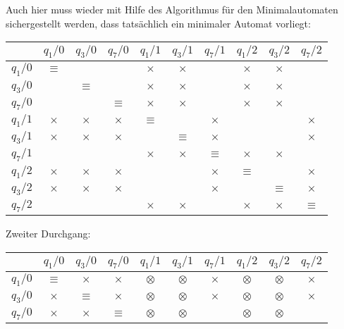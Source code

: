 \begin{loesung}
\begin{teilaufgaben}
Auch hier muss wieder mit Hilfe des Algorithmus für den Minimalautomaten
sichergestellt werden, dass tatsächlich ein minimaler Automat vorliegt:
\begin{center}
\begin{tabular}{|c|ccccccccc|}
\hline
         &$q_1/0$  &$q_3/0$  &$q_7/0$  &$q_1/1$  &$q_3/1$  &$q_7/1$  &$q_1/2$  &$q_3/2$  &$q_7/2$  \\
\hline
$q_1/0$  &$\equiv$ &$       $&$       $&$\times $&$\times $&$       $&$\times $&$\times $&$       $\\
$q_3/0$  &$       $&$\equiv$ &$       $&$\times $&$\times $&$       $&$\times $&$\times $&$       $\\
$q_7/0$  &$       $&$       $&$\equiv$ &$\times $&$\times $&$       $&$\times $&$\times $&$       $\\
$q_1/1$  &$\times $&$\times $&$\times $&$\equiv$ &$       $&$\times $&$       $&$       $&$\times $\\
$q_3/1$  &$\times $&$\times $&$\times $&$       $&$\equiv$ &$\times $&$       $&$       $&$\times $\\
$q_7/1$  &$       $&$       $&$       $&$\times $&$\times $&$\equiv$ &$\times $&$\times $&$       $\\
$q_1/2$  &$\times $&$\times $&$\times $&$       $&$       $&$\times $&$\equiv$ &$       $&$\times $\\
$q_3/2$  &$\times $&$\times $&$\times $&$       $&$       $&$\times $&$       $&$\equiv$ &$\times $\\
$q_7/2$  &$       $&$       $&$       $&$\times $&$\times $&$       $&$\times $&$\times $&$\equiv$ \\
\hline
\end{tabular}
\end{center}
Zweiter Durchgang:
\begin{center}
\begin{tabular}{|c|ccccccccc|}
\hline
         &$q_1/0$  &$q_3/0$  &$q_7/0$  &$q_1/1$  &$q_3/1$  &$q_7/1$  &$q_1/2$  &$q_3/2$  &$q_7/2$  \\
\hline
$q_1/0$  &$\equiv$ &$\times $&$\times $&$\otimes$&$\otimes$&$\times $&$\otimes$&$\otimes$&$\times $\\
$q_3/0$  &$\times $&$\equiv$ &$\times $&$\otimes$&$\otimes$&$\times $&$\otimes$&$\otimes$&$\times $\\
$q_7/0$  &$\times $&$\times $&$\equiv$ &$\otimes$&$\otimes$&$       $&$\otimes$&$\otimes$&$       $\\

\end{tabular}
\end{center}
\end{teilaufgaben}
\end{loesung}
